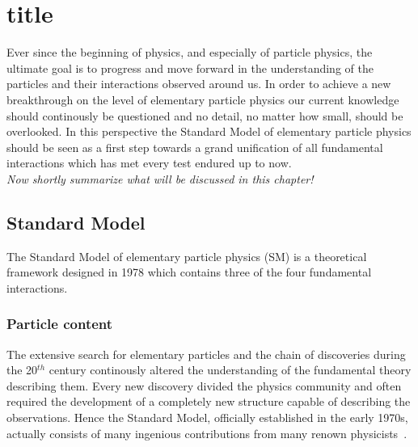 \chapter{title} \label{chp::SM}

Ever since the beginning of physics, and especially of particle physics, the ultimate goal is to progress and move forward in the understanding of the particles and their interactions observed around us. 
In order to achieve a new breakthrough on the level of elementary particle physics our current knowledge should continously be questioned and no detail, no matter how small, should be overlooked.
In this perspective the Standard Model of elementary particle physics should be seen as a first step towards a grand unification of all fundamental interactions which has met every test endured up to now.
\\
\textit{Now shortly summarize what will be discussed in this chapter!}

\section{Standard Model}
The Standard Model of elementary particle physics (SM) is a theoretical framework designed in 1978 which contains three of the four fundamental interactions.

\subsection{Particle content}

The extensive search for elementary particles and the chain of discoveries during the 20$^{th}$ century continously altered the understanding of the fundamental theory describing them.
Every new discovery divided the physics community and often required the development of a completely new structure capable of describing the observations.
Hence the Standard Model, officially established in the early 1970s, actually consists of many ingenious contributions from many renown physicists~\cite{Griffiths}. 

